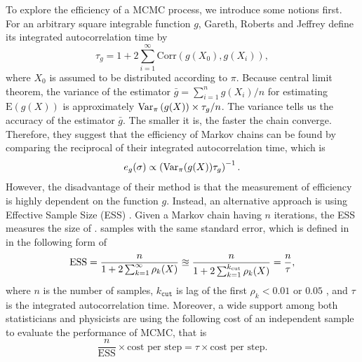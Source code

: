 To explore the efficiency of a MCMC process, we introduce some notions first. For an arbitrary square integrable function $g$, Gareth, Roberts and Jeffrey \cite{roberts2001optimal} define its integrated autocorrelation time by 
\begin{equation*}
\tau_g = 1+ 2\sum_{i=1}^{\infty} \mathrm{Corr}\left( g(X_0),g(X_i) \right),
\end{equation*}
where $X_0$ is assumed to be distributed according to $\pi$. Because central limit theorem, the variance of the estimator $\bar{g} = \sum_{i=1}^{n}g(X_i)/n$ for estimating $\mathrm{E}\left(g(X)\right)$ is approximately $\mathrm{Var}_\pi\left(g(X)\right)\times \tau_g/n$. The variance tells us the accuracy of the estimator $\bar{g}$. The smaller it is, the faster the chain converge. Therefore, they suggest that the efficiency of Markov chains can be found by comparing the reciprocal of their integrated autocorrelation time, which is 
\begin{equation*}
e_g(\sigma)\propto \left( \mathrm{Var}_\pi (g(X))\tau_g \right)^{-1}. 
\end{equation*}
However, the disadvantage of their method is that the measurement of efficiency is highly dependent on the function $g$. Instead, an alternative approach is using Effective Sample Size (ESS) \cite{kass1998markov} \cite{robert2004monte}. Given a Markov chain having $n$ iterations, the ESS measures the size of \iid . samples with the same standard error, which is defined in \cite{gong2016practical} in the following form of  
\begin{equation*}
\mbox{ESS} =  \frac{n}{1+2\sum_{k=1}^{\infty}\rho_k(X)} \approxeq \frac{n}{1+2\sum_{k=1}^{k_\text{\tiny cut}}\rho_k(X)}= \frac{n}{\tau}, 
\end{equation*}
where $n$ is the number of samples, $k_\mathtt{cut}$ is lag of the first $\rho_k<0.01 \mbox{ or } 0.05$ , and $\tau$ is the integrated autocorrelation time. Moreover, a wide support among both statisticians \cite{geyer1992practical} and physicists \cite{sokal1997monte} are using the following cost of an independent sample to evaluate the performance of MCMC, that is 
\begin{equation*}
\frac{n}{\mbox{ESS}}\times \mbox{cost per step} = \tau \times  \mbox{cost per step}.
\end{equation*} 


